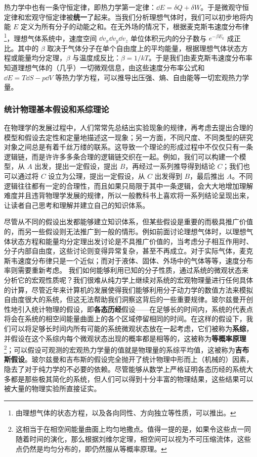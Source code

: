 热力学中也有一条守恒定律，即热力学第一定律：$\dd E=\delta Q+\delta W$。于是微观守恒定律和宏观守恒定律被\textbf{统一}了起来。当我们分析理想气体时，我们可以初步地将内能 $E$ 定义为所有分子的动能之和。在无外场的情况下，根据麦克斯韦速度分布律\footnote{由理想气体的状态方程，以及各向同性、方向独立等性质，可以推出。}，理想气体系统中，速度空间 $\dd v_x\dd v_y\dd v_z$ 单位体积元内的分子数与 $e^{-\beta E_k}$ 成正比。其中的 $\beta$ 取决于气体分子在单个自由度上的平均能量，根据理想气体状态方程或能量均分定理，$\beta$ 与温度成反比：$\beta=1/kT$。于是我们由麦克斯韦速度分布率知道理想气体的（几乎）一切微观信息，由这些速度分布率公式和 $\dd E=T\dd S-p\dd V$ 等热力学方程，可以推导出压强、熵、自由能等一切宏观热力学量。
\subsubsection{统计物理基本假设和系综理论}
在物理学的发展过程中，人们常常先总结出实验现象的规律，再考虑去提出合理的模型和假设去定性和定量地描述这一现象；另一方面，不同尺度、不同类型的研究对象之间总是有着千丝万缕的联系。这导致一个理论的形成过程中不仅仅只有一条逻辑链，而是许许多多条合理的逻辑链交织在一起。例如，我们可以构建一个模型，从 $A$ 出发，提出一定假设，提出 $B$，再经过一系列推导得到结论 $C$；我们也可以通过将 $C$ 设立为公理，提出一定假设，从 $C$ 出发得到 $B$，最后推出 $A$。不同逻辑往往都有一定的合理性，而且如果只局限于其中一条逻辑，会大大地增加理解难度并且违背物理学发展的规律，所以一般教科书上喜欢将一系列结论呈现出来，让读者自己思考和理解并建立自己的知识体系。

尽管从不同的假设出发都能够建立知识体系，但某些假设是重要的而极具推广价值的，而另一些假设则无法推广到一般的情形。例如前面讨论理想气体时，以理想气体状态方程和能量均分定理出发讨论是不具推广价值的，当考虑分子相互作用时、分子内部自由度，这些讨论则变得异常复杂，甚至不再成立。对于实际气体，麦克斯韦速度分布律只是一个近似；而对于液体、固体、外场中的气体等等，速度分布率则需要重新考虑。 我们如何能够利用已知的分子性质，通过系统的微观状态来分析它的宏观性质呢？我们很难从纯力学上继续对系统的宏观物理量进行任何具体的计算，尽管近年来计算机的发展使得我们能够利用分子动力学的数值方法来模拟自由度很大的系统，但这无法帮助我们洞察这背后的一些重要规律。玻尔兹曼开创性地引入统计物理的假设，即\textbf{各态历经}假设——在足够长的时间内，系统的代表点将会在系统的相空间能量曲面上的各个区域停留相同的时间。在这样的假设下，我们可以将足够长时间内所有可能的系统微观状态放在一起考虑，它们被称为\textbf{系综}，并假设在这个系综内每个微观状态出现的概率都是相等的，这被称为\textbf{等概率原理}\footnote{这相当于在相空间能量曲面上均匀地撒点。值得一提的是，如果令这些点一同随着时间的演化，那么根据刘维尔定理，相空间可以视为不可压缩流体，这些点仍然是均匀分布的，即仍然服从等概率原理。}；可以假设可观测的宏观热力学量的值就是物理量的系综平均值，这被称为\textbf{吉布斯假设}。玻尔兹曼和吉布斯的假设完全抛开了统计物理中形而上（机械的）因素，隐去了对于纯力学的不必要的依赖。尽管能够从数学上严格证明各态历经的系统大多都是那些极其简化的系统，但人们可以得到十分丰富的物理结果，这些结果可以被大量的物理实验所直接证实。


